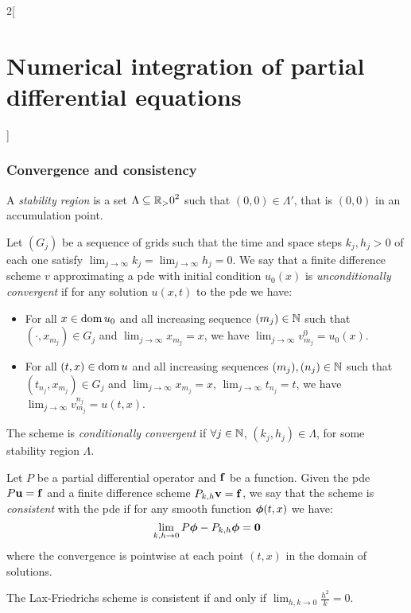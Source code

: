 \documentclass[../../../main_math.tex]{subfiles}
\begin{document}
\begin{multicols}{2}[\section{Numerical integration of partial differential equations}]
  \subsubsection{Convergence and consistency}
  \begin{definition}
    A \emph{stability region} is a set $\Lambda\subseteq{\ensuremath{\mathbb{R}}_>0}^2$ such that $(0,0)\in\Lambda'$, that is $(0,0)$ in an accumulation point.
  \end{definition}
  \begin{definition}
    Let $(G_j)$ be a sequence of grids such that the time and space steps $k_j,h_j>0$ of each one satisfy $\displaystyle \lim_{j\to\infty}k_j=\lim_{j\to\infty}h_j=0$.
    We say that a finite difference scheme $v$ approximating a pde with initial condition $u_0(x)$ is \emph{unconditionally convergent} if for any solution $u(x,t)$ to the pde we have:
    \begin{itemize}
      \item For all $x\in\operatorname{dom} u_0$ and all increasing sequence $(m_j)\in\mathbb{N}$ such that $(\cdot,x_{m_j})\in G_j$ and $\displaystyle\lim_{j\to\infty} x_{m_j}=x$, we have $\displaystyle\lim_{j\to\infty} v_{m_j}^0=u_0(x)$.
      \item For all $(t,x)\in\operatorname{dom} u$ and all increasing sequences $(m_j),(n_j)\in\mathbb{N}$ such that $(t_{n_j},x_{m_j})\in G_j$ and $\displaystyle\lim_{j\to\infty} x_{m_j}=x$, $\displaystyle\lim_{j\to\infty} t_{n_j}=t$, we have $\displaystyle\lim_{j\to\infty} v_{m_j}^{n_j}=u(t,x)$.
    \end{itemize}
    The scheme is \emph{conditionally convergent} if $\forall j\in\mathbb{N}$, $(k_j,h_j)\in\Lambda$, for some stability region $\Lambda$.
  \end{definition}
  \begin{definition}
    Let $P$ be a partial differential operator and $\boldsymbol{\mathrm{f}}$ be a function. Given the pde $P\boldsymbol{\mathrm{u}}=\boldsymbol{\mathrm{f}}$ and a finite difference scheme $P_{k,h}\boldsymbol{\mathrm{v}}=\boldsymbol{\mathrm{f}}$, we say that the scheme is \emph{consistent} with the pde if for any smooth function $\boldsymbol{\mathrm{\phi}}(t,x)$ we have: $$\lim_{k,h\to 0}P\boldsymbol{\mathrm{\phi}}-P_{k,h}\boldsymbol{\mathrm{\phi}}=\boldsymbol{\mathrm{0}}$$
    where the convergence is pointwise at each point $(t,x)$ in the domain of solutions.
  \end{definition}
  \begin{lemma}
    The Lax-Friedrichs scheme is consistent if and only if $\displaystyle\lim_{h,k\to 0}\frac{h^2}{k}=0$.
  \end{lemma}

\end{multicols}
\end{document}
